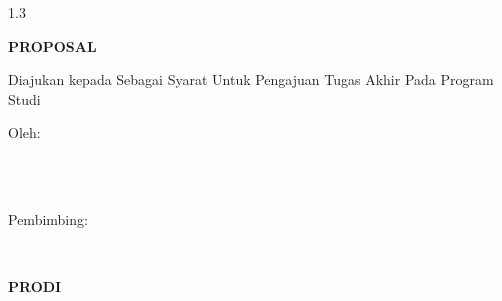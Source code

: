 
\newpage
{}
\begin{center}

	\begin{spacing}{1.3}
		\centering
		\textbf{\large \MakeUppercase{\judulidtabbed}}
	\end{spacing}
	\vspace{2.5cm}

	\textbf{\MakeUppercase{\large{Proposal \tipe}}}\\[0.5cm]
	\begin{onehalfspace}
		Diajukan kepada {\fakultas} {\universitas} Sebagai Syarat Untuk Pengajuan Tugas Akhir Pada Program Studi \prodi\\[1.8cm]
	\end{onehalfspace}

	\large Oleh: \\
	\begin{onehalfspace}
		\large{\penulis} \\
		\large{\nim}\\[1.5cm]
	\end{onehalfspace}
	\vspace{1.5cm}

	\large Pembimbing: \\
	\begin{onehalfspace}
		\large{\pembimbingutama} \\
	\end{onehalfspace}

	\vfill

	\textbf{\large \MakeUppercase{Prodi \gelar \prodi}}\\
	\textbf{\large \MakeUppercase{\fakultas}}\\
	\textbf{\large \MakeUppercase{\universitas}}\\
	\textbf{\large \the\year{}}\\
\end{center}

